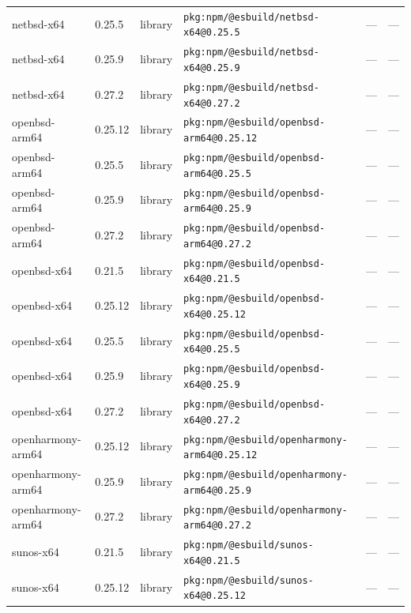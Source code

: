 \documentclass[11pt,a4paper]{article}
\begin{document}
\begin{longtable}{|p{4cm}|p{2cm}|p{1.6cm}|p{5cm}|p{1.5cm}|p{3.5cm}|}
\raggedright netbsd-x64 & 0.25.5 & library & \small\texttt{pkg:npm/@esbuild/netbsd-x64@0.25.5} & — & \small — \\
\raggedright netbsd-x64 & 0.25.9 & library & \small\texttt{pkg:npm/@esbuild/netbsd-x64@0.25.9} & — & \small — \\
\raggedright netbsd-x64 & 0.27.2 & library & \small\texttt{pkg:npm/@esbuild/netbsd-x64@0.27.2} & — & \small — \\
\raggedright openbsd-arm64 & 0.25.12 & library & \small\texttt{pkg:npm/@esbuild/openbsd-arm64@0.25.12} & — & \small — \\
\raggedright openbsd-arm64 & 0.25.5 & library & \small\texttt{pkg:npm/@esbuild/openbsd-arm64@0.25.5} & — & \small — \\
\raggedright openbsd-arm64 & 0.25.9 & library & \small\texttt{pkg:npm/@esbuild/openbsd-arm64@0.25.9} & — & \small — \\
\raggedright openbsd-arm64 & 0.27.2 & library & \small\texttt{pkg:npm/@esbuild/openbsd-arm64@0.27.2} & — & \small — \\
\raggedright openbsd-x64 & 0.21.5 & library & \small\texttt{pkg:npm/@esbuild/openbsd-x64@0.21.5} & — & \small — \\
\raggedright openbsd-x64 & 0.25.12 & library & \small\texttt{pkg:npm/@esbuild/openbsd-x64@0.25.12} & — & \small — \\
\raggedright openbsd-x64 & 0.25.5 & library & \small\texttt{pkg:npm/@esbuild/openbsd-x64@0.25.5} & — & \small — \\
\raggedright openbsd-x64 & 0.25.9 & library & \small\texttt{pkg:npm/@esbuild/openbsd-x64@0.25.9} & — & \small — \\
\raggedright openbsd-x64 & 0.27.2 & library & \small\texttt{pkg:npm/@esbuild/openbsd-x64@0.27.2} & — & \small — \\
\raggedright openharmony-arm64 & 0.25.12 & library & \small\texttt{pkg:npm/@esbuild/openharmony-arm64@0.25.12} & — & \small — \\
\raggedright openharmony-arm64 & 0.25.9 & library & \small\texttt{pkg:npm/@esbuild/openharmony-arm64@0.25.9} & — & \small — \\
\raggedright openharmony-arm64 & 0.27.2 & library & \small\texttt{pkg:npm/@esbuild/openharmony-arm64@0.27.2} & — & \small — \\
\raggedright sunos-x64 & 0.21.5 & library & \small\texttt{pkg:npm/@esbuild/sunos-x64@0.21.5} & — & \small — \\
\raggedright sunos-x64 & 0.25.12 & library & \small\texttt{pkg:npm/@esbuild/sunos-x64@0.25.12} & — & \small — \\

\end{longtable}
\end{document}

